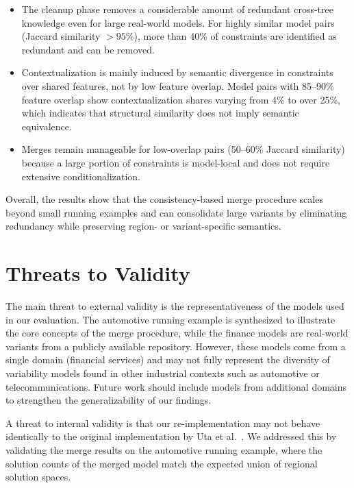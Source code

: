 \documentclass{ceurart}
\begin{document}
\begin{itemize}[leftmargin=*]
\item The cleanup phase removes a considerable amount of redundant
      cross-tree knowledge even for large real-world models. For highly
      similar model pairs (Jaccard similarity $>95\%$), more than 40\% of constraints
      are identified as redundant and can be removed.
\item Contextualization is mainly induced by semantic divergence in
      constraints over shared features, not by low feature overlap.
      Model pairs with 85--90\% feature overlap show contextualization
      shares varying from 4\% to over 25\%, which indicates that structural
      similarity does not imply semantic equivalence.
\item Merges remain manageable for low-overlap pairs (50--60\% Jaccard similarity)
      because a large portion of constraints is model-local and does not
      require extensive conditionalization.
\end{itemize}

Overall, the results show that the consistency-based merge procedure
scales beyond small running examples and can consolidate large
variants by eliminating redundancy while preserving region- or
variant-specific semantics.

\section{Threats to Validity}
The main threat to external validity is the representativeness of the models used in our evaluation. The automotive running example is synthesized to illustrate the core concepts of the merge procedure, while the finance models are real-world variants from a publicly available repository. However, these models come from a single domain (financial services) and may not fully represent the diversity of variability models found in other industrial contexts such as automotive or telecommunications. Future work should include models from additional domains to strengthen the generalizability of our findings.

A threat to internal validity is that our re-implementation may not behave identically to the original implementation by Uta et al.~\cite{Uta2019}. We addressed this by validating the merge results on the automotive running example, where the solution counts of the merged model match the expected union of regional solution spaces.
\end{document}
